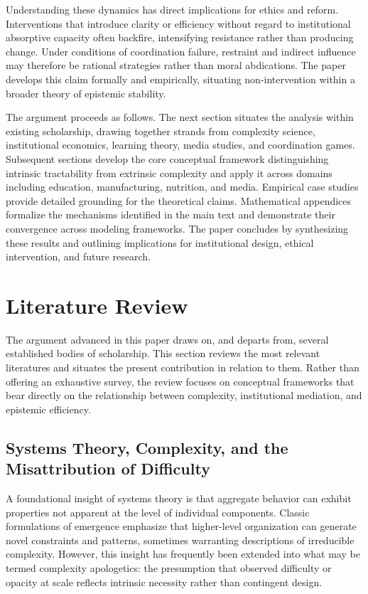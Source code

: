 \documentclass[11pt]{article}
\begin{document}
Understanding these dynamics has direct implications for ethics and reform. Interventions that introduce clarity or efficiency without regard to institutional absorptive capacity often backfire, intensifying resistance rather than producing change. Under conditions of coordination failure, restraint and indirect influence may therefore be rational strategies rather than moral abdications. The paper develops this claim formally and empirically, situating non-intervention within a broader theory of epistemic stability.

The argument proceeds as follows. The next section situates the analysis within existing scholarship, drawing together strands from complexity science, institutional economics, learning theory, media studies, and coordination games. Subsequent sections develop the core conceptual framework distinguishing intrinsic tractability from extrinsic complexity and apply it across domains including education, manufacturing, nutrition, and media. Empirical case studies provide detailed grounding for the theoretical claims. Mathematical appendices formalize the mechanisms identified in the main text and demonstrate their convergence across modeling frameworks. The paper concludes by synthesizing these results and outlining implications for institutional design, ethical intervention, and future research.

\section{Literature Review}

The argument advanced in this paper draws on, and departs from, several established bodies of scholarship. This section reviews the most relevant literatures and situates the present contribution in relation to them. Rather than offering an exhaustive survey, the review focuses on conceptual frameworks that bear directly on the relationship between complexity, institutional mediation, and epistemic efficiency.

\subsection{Systems Theory, Complexity, and the Misattribution of Difficulty}

A foundational insight of systems theory is that aggregate behavior can exhibit properties not apparent at the level of individual components. Classic formulations of emergence emphasize that higher-level organization can generate novel constraints and patterns, sometimes warranting descriptions of irreducible complexity. However, this insight has frequently been extended into what may be termed complexity apologetics: the presumption that observed difficulty or opacity at scale reflects intrinsic necessity rather than contingent design.
\end{document}
